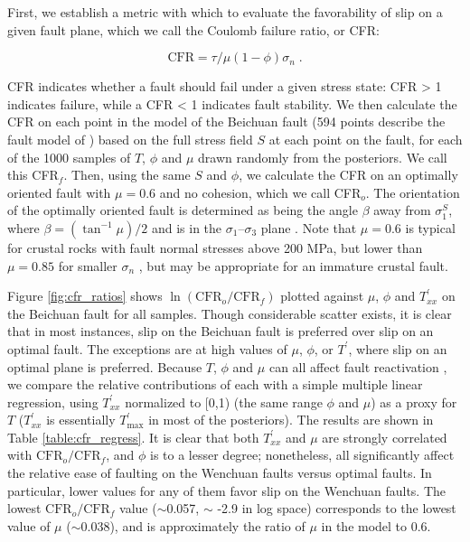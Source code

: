 \documentclass[draft,jgrga]{AGUTeX}
\begin{document}
\begin{article}
First, we establish a metric with which to evaluate the favorability of
slip on a given fault plane, which we call the Coulomb failure ratio, or
CFR:

\begin{equation}
\mathrm{CFR} = \tau / \mu (1 - \phi) \sigma_n \; .
\label{eqn:cfr}
\end{equation}

CFR indicates whether a fault should fail under a given stress state:
CFR \textgreater{} 1 indicates failure, while a CFR \textless{} 1
indicates fault stability. We then calculate the CFR on each point in
the model of the Beichuan fault (594 points describe the fault model of
\citet{zhang2011}) based on the full stress field $S$ at
each point on the fault, for each of the 1000 samples of $T$, $\phi$ and
$\mu$ drawn randomly from the posteriors. We call this CFR$_f$. Then,
using the same $S$ and $\phi$, we calculate the CFR on an optimally
oriented fault with $\mu=0.6$ and no cohesion, which we call CFR$_o$.
The orientation of the optimally oriented fault is determined as being
the angle $\beta$ away from $\sigma^S_1$, where $\beta = (\tan^{-1} \mu) / 2$
and is in the $\sigma_1$--$\sigma_3$ plane \citep[e.g.,][]{sibson1985}.
Note that $\mu=0.6$ is typical for crustal rocks with fault normal stresses
above 200 MPa, but lower than $\mu = 0.85$ for smaller $\sigma_n$
\citep{byerlee1978}, but may be appropriate for an immature crustal
fault.

Figure \ref{fig:cfr_ratios} shows
$\ln (\mathrm{CFR}_o / \mathrm{CFR}_f)$ plotted against $\mu$, $\phi$
and $T^\prime_{xx}$ on the Beichuan fault for all samples. Though
considerable scatter exists, it is clear that in most instances, slip on
the Beichuan fault is preferred over slip on an optimal fault. The
exceptions are at high values of $\mu$, $\phi$, or $T^\prime$, where
slip on an optimal plane is preferred. Because $T$, $\phi$ and $\mu$ can
all affect fault reactivation \citep[e.g.,][]{sibson1985}, we compare the
relative contributions of each with a simple multiple linear regression,
using $T^\prime_{xx}$ normalized to [0,1) (the same range $\phi$ and
$\mu$) as a proxy for $T$ ($T^\prime_{xx}$ is essentially
$T^\prime_{\mathrm{max}}$ in most of the posteriors). The results are
shown in Table \ref{table:cfr_regress}. It is clear that both $T^\prime_{xx}$
and $\mu$ are strongly correlated with $\mathrm{CFR}_o/\mathrm{CFR}_f$, and $\phi$ is to a lesser degree; nonetheless, all
significantly affect the relative ease of faulting on the Wenchuan faults
versus optimal faults. In particular, lower values for any of them favor slip
on the Wenchuan faults. The lowest $\mathrm{CFR}_o/\mathrm{CFR}_f$ value
($\sim$0.057, $\sim$ -2.9 in log space) corresponds to the lowest value of
$\mu$ ($\sim$0.038), and is approximately the ratio of $\mu$ in the model
to 0.6.


\end{article}
\end{document}
